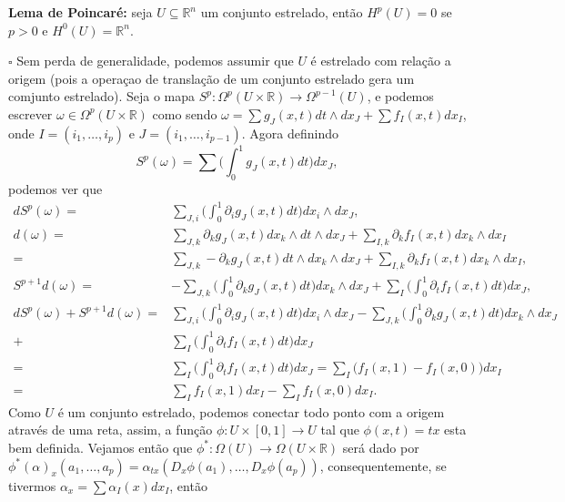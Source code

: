 \documentclass{article}
\begin{document}
	\textbf{Lema de Poincaré:} seja $U \subseteq \mathbb{R}^{n}$ um conjunto estrelado, então $H^{p}(U) = 0$ se $p>0$ e $H^{0}(U) = \mathbb{R}^{n}$.
	
	$\square$ Sem perda de generalidade, podemos assumir que $U$ é estrelado com relação a origem (pois a operaçao de translação de um conjunto estrelado gera um comjunto estrelado). Seja o mapa $S^{p}: \Omega^{p}(U \times \mathbb{R}) \to \Omega^{p-1}(U)$, e podemos escrever $\omega \in \Omega^{p}(U \times \mathbb{R}) $ como sendo $\omega = \sum g_{J}(x,t)dt \wedge dx_{J} + \sum f_{I}(x,t)dx_{I}$, onde $I=(i_{1}, \dots ,i_{p})$ e $J=(i_{1}, \dots ,i_{p-1})$. Agora definindo
	$$
	S^{p}(\omega) = \sum \Big( \int_{0}^{1} g_{J}(x,t)dt \Big) dx_{J},
	$$
	podemos ver que
	$$
	\begin{aligned}
	dS^{p}(\omega) =& \sum_{J,i} \Big( \int_{0}^{1} \partial_{i} g_{J}(x,t)dt \Big) dx_{i} \wedge dx_{J},
	\\
	d(\omega) =& \sum_{J,k} \partial_{k} g_{J}(x,t) dx_{k} \wedge dt \wedge dx_{J} + \sum_{I,k} \partial_{k} f_{I}(x,t) dx_{k} \wedge dx_{I}
	\\
	 =& \sum_{J,k} -\partial_{k} g_{J}(x,t) dt \wedge dx_{k} \wedge dx_{J} + \sum_{I,k} \partial_{k} f_{I}(x,t) dx_{k} \wedge dx_{I},
	 \\
	 S^{p+1}d(\omega) =&  -\sum_{J,k} \Big( \int_{0}^{1}  \partial_{k} g_{J}(x,t)dt \Big) dx_{k} \wedge dx_{J} + \sum_{I} \Big( \int_{0}^{1}  \partial_{t} f_{I}(x,t)dt \Big) dx_{J},
	 \\
	  d S^{p}(\omega) + S^{p+1}d(\omega) =& \sum_{J,i} \Big( \int_{0}^{1} \partial_{i} g_{J}(x,t)dt \Big) dx_{i} \wedge dx_{J} -\sum_{J,k} \Big( \int_{0}^{1}  \partial_{k} g_{J}(x,t)dt \Big) dx_{k} \wedge dx_{J} 
	  \\
	  +& \sum_{I} \Big( \int_{0}^{1}  \partial_{t} f_{I}(x,t)dt \Big) dx_{J}
	  \\
	  =& \sum_{I} \Big( \int_{0}^{1}  \partial_{t} f_{I}(x,t)dt \Big) dx_{J} = \sum_{I} \Big( f_{I}(x,1)  - f_{I}(x,0)\Big) dx_{I}
	  \\
	  =& \sum_{I} f_{I}(x,1) dx_{I} - \sum_{I} f_{I}(x,0) dx_{I}.
	\end{aligned}
	$$
	Como $U$ é um conjunto estrelado, podemos conectar todo ponto com a origem através de uma reta, assim, a função $\phi: U \times [0,1] \to U$ tal que $\phi(x,t) = tx$ esta bem definida. Vejamos então que $\phi^{*} : \Omega(U) \to \Omega(U \times \mathbb{R})$ será dado por $\phi^{*}(\alpha)_{x}(a_{1},\dots,a_{p}) = \alpha_{tx}(D_{x}\phi(a_{1}),\dots, D_{x}\phi(a_{p}))$, consequentemente, se tivermos $\alpha_{x} = \sum \alpha_{I}(x)dx_{I}$, então 
\end{document}
